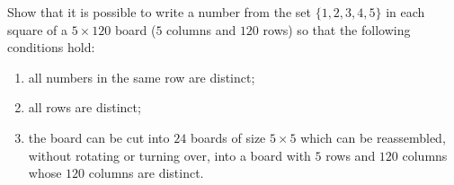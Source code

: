 Show that it is possible to write a number from the set $\{1,2,3,4,5\}$ in each square of a $5\times120$ board ($5$ columns and $120$ rows) so that the following conditions hold:
\begin{enumerate}
\item[(i)] all numbers in the same row are distinct;
\item[(ii)] all rows are distinct;
\item[(iii)] the board can be cut into $24$ boards of size $5\times5$ which can be reassembled, without rotating or turning over, into a board with $5$ rows and $120$ columns whose $120$ columns are distinct.
\end{enumerate}
